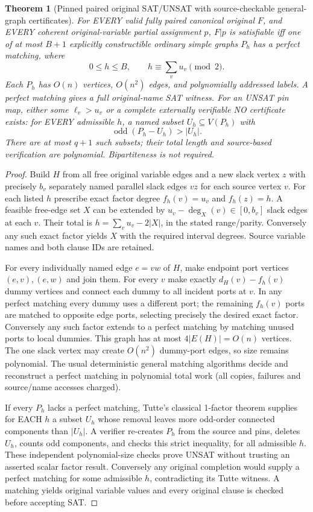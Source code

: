 \documentclass[11pt]{article}
\newtheorem{theorem}{Theorem}
\begin{document}
\begin{theorem}[Pinned paired original SAT/UNSAT with source-checkable general-graph certificates]
For EVERY valid fully paired canonical original $F$, and EVERY coherent original-variable partial assignment $p$, $F|p$ is satisfiable iff one of at most $B+1$ explicitly constructible \emph{ordinary simple graphs} $P_h$ has a perfect matching, where
\[
0\le h\le B,\qquad h\equiv \sum_v u_v\pmod2.
\]
Each $P_h$ has $O(n)$ vertices, $O(n^2)$ edges, and polynomially addressed labels. A perfect matching gives a full original-name SAT witness. For an UNSAT pin map, either some $\ell_v>u_v$ or a complete externally verifiable NO certificate exists: for EVERY admissible $h$, a named subset $U_h\subseteq V(P_h)$ with
\[
\operatorname{odd}(P_h-U_h)>|U_h|.
\]
There are at most $q+1$ such subsets; their total length and source-based verification are polynomial. Bipartiteness is not required.
\end{theorem}
\begin{proof}
Build $H$ from all free original variable edges and a new slack vertex $z$ with precisely $b_v$ separately named parallel slack edges $vz$ for each source vertex $v$. For each listed $h$ prescribe exact factor degree $f_h(v)=u_v$ and $f_h(z)=h$. A feasible free-edge set $X$ can be extended by $u_v-\deg_X(v)\in[0,b_v]$ slack edges at each $v$. Their total is $h=\sum_v u_v-2|X|$, in the stated range/parity. Conversely any such exact factor yields $X$ with the required interval degrees. Source variable names and both clause IDs are retained.

For every individually named edge $e=vw$ of $H$, make endpoint port vertices $(e,v),(e,w)$ and join them. For every $v$ make exactly $d_H(v)-f_h(v)$ dummy vertices and connect each dummy to all incident ports at $v$. In any perfect matching every dummy uses a different port; the remaining $f_h(v)$ ports are matched to opposite edge ports, selecting precisely the desired exact factor. Conversely any such factor extends to a perfect matching by matching unused ports to local dummies. This graph has at most $4|E(H)|=O(n)$ vertices. The one slack vertex may create $O(n^2)$ dummy-port edges, so size remains polynomial. The usual deterministic general matching algorithms decide and reconstruct a perfect matching in polynomial total work (all copies, failures and source/name accesses charged).

If every $P_h$ lacks a perfect matching, Tutte's classical 1-factor theorem supplies for EACH $h$ a subset $U_h$ whose removal leaves more odd-order connected components than $|U_h|$. A verifier re-creates $P_h$ from the source and pins, deletes $U_h$, counts odd components, and checks this strict inequality, for all admissible $h$. These independent polynomial-size checks prove UNSAT without trusting an asserted scalar factor result. Conversely any original completion would supply a perfect matching for some admissible $h$, contradicting its Tutte witness. A matching yields original variable values and every original clause is checked before accepting SAT.
\end{proof}
\end{document}
